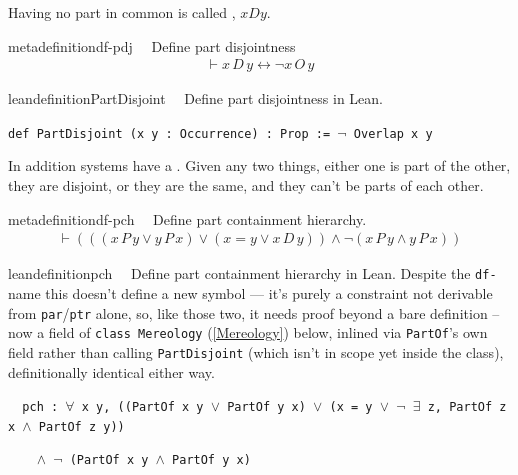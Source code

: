 \pn Having no part in common is called , $xDy$.
\begin{restatable}{metadefinition}{df-pdj}~~ Define part disjointness
\begin{align}
\vdash x \,D \,y \leftrightarrow \lnot x \,O \,y\label{eq:df-pdj}\tag{df-pdj}
\end{align}
\end{restatable}

\begin{restatable}{leandefinition}{PartDisjoint}~~ Define part disjointness in Lean.

\texttt{\textcolor{leancolor}{def} \textcolor{leanyellow}{PartDisjoint} (x y : Occurrence) : Prop := $\lnot$ Overlap x y}
\label{PartDisjoint}
\end{restatable}

\pn In addition systems have a .
Given any two things, either one is part of the other, they are disjoint, or they are the same, and they can't be parts of each other.
\begin{restatable}{metadefinition}{df-pch}~~ Define part containment hierarchy.
\begin{align}
\vdash ( ( ( x \,P \,y \vee y \,P \,x ) \vee ( x = y \vee x \,D \,y ) ) \wedge
    \lnot ( x \,P \,y \wedge y \,P \,x ) )\label{eq:df-pch}\tag{df-pch}
\end{align}
\end{restatable}

\begin{restatable}{leandefinition}{pch}~~ Define part containment hierarchy in Lean. Despite the
\texttt{df-} name this doesn't define a new symbol --- it's purely a constraint not derivable from
\texttt{par}/\texttt{ptr} alone, so, like those two, it needs proof beyond a bare definition -- now a field
of \texttt{class Mereology} (\ref{Mereology}) below, inlined via \texttt{PartOf}'s own field rather than
calling \texttt{PartDisjoint} (which isn't in scope yet inside the class), definitionally identical either
way.

\texttt{~~pch : $\forall$ x y, ((PartOf x y $\vee$ PartOf y x) $\vee$ (x = y $\vee$ $\lnot$ $\exists$ z, PartOf z x $\wedge$ PartOf z y))}

\texttt{~~~~$\wedge$ $\lnot$ (PartOf x y $\wedge$ PartOf y x)}
\label{pch}
\end{restatable}

